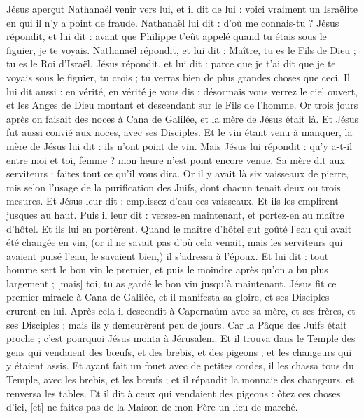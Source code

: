 \begin{multicols}{2}
Jésus aperçut Nathanaël venir vers lui, et il dit de lui : voici vraiment un Israëlite en qui il n'y a point de fraude.
Nathanaël lui dit : d'où me connais-tu ? Jésus répondit, et lui dit : avant que Philippe t'eût appelé quand tu étais sous le figuier, je te voyais.
Nathanaël répondit, et lui dit : Maître, tu es le Fils de Dieu ; tu es le Roi d'Israël.
Jésus répondit, et lui dit : parce que je t'ai dit que je te voyais sous le figuier, tu crois ; tu verras bien de plus grandes choses que ceci.
Il lui dit aussi : en vérité, en vérité je vous dis : désormais vous verrez le ciel ouvert, et les Anges de Dieu montant et descendant sur le Fils de l'homme.
\VerseOne{}Or trois jours après on faisait des noces à Cana de Galilée, et la mère de Jésus était là.
Et Jésus fut aussi convié aux noces, avec ses Disciples.
Et le vin étant venu à manquer, la mère de Jésus lui dit : ils n'ont point de vin.
Mais Jésus lui répondit : qu'y a-t-il entre moi et toi, femme ? mon heure n'est point encore venue.
Sa mère dit aux serviteurs : faites tout ce qu'il vous dira.
Or il y avait là six vaisseaux de pierre, mis selon l'usage de la purification des Juifs, dont chacun tenait deux ou trois mesures.
Et Jésus leur dit : emplissez d'eau ces vaisseaux. Et ils les emplirent jusques au haut.
Puis il leur dit : versez-en maintenant, et portez-en au maître d'hôtel. Et ils lui en portèrent.
Quand le maître d'hôtel eut goûté l'eau qui avait été changée en vin, (or il ne savait pas d'où cela venait, mais les serviteurs qui avaient puisé l'eau, le savaient bien,) il s'adressa à l'époux.
Et lui dit : tout homme sert le bon vin le premier, et puis le moindre après qu'on a bu plus largement ; [mais] toi, tu as gardé le bon vin jusqu'à maintenant.
Jésus fit ce premier miracle à Cana de Galilée, et il manifesta sa gloire, et ses Disciples crurent en lui.
Après cela il descendit à Capernaüm avec sa mère, et ses frères, et ses Disciples ; mais ils y demeurèrent peu de jours.
Car la Pâque des Juifs était proche ; c'est pourquoi Jésus monta à Jérusalem.
Et il trouva dans le Temple des gens qui vendaient des bœufs, et des brebis, et des pigeons ; et les changeurs qui y étaient assis.
Et ayant fait un fouet avec de petites cordes, il les chassa tous du Temple, avec les brebis, et les bœufs ; et il répandit la monnaie des changeurs, et renversa les tables.
Et il dit à ceux qui vendaient des pigeons : ôtez ces choses d'ici, [et] ne faites pas de la Maison de mon Père un lieu de marché.

\end{multicols}
